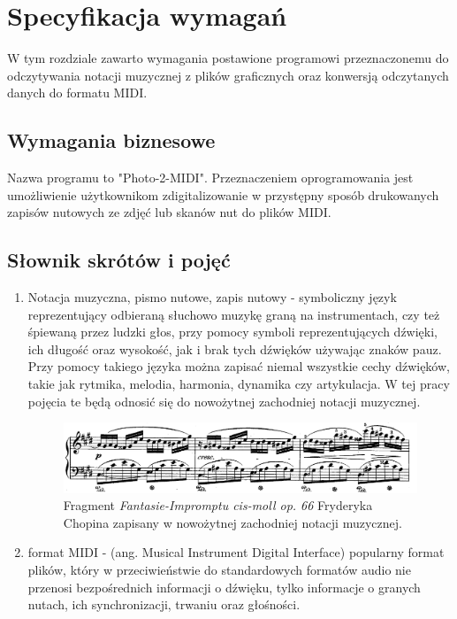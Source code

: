 \chapter{Specyfikacja wymagań}
W tym rozdziale zawarto wymagania postawione programowi przeznaczonemu do odczytywania notacji muzycznej z plików graficznych oraz konwersją odczytanych danych do formatu MIDI.

\section{Wymagania biznesowe}
Nazwa programu to "Photo-2-MIDI". Przeznaczeniem oprogramowania jest umożliwienie użytkownikom zdigitalizowanie w przystępny sposób drukowanych zapisów nutowych ze zdjęć lub skanów nut do plików MIDI.

\section{Słownik skrótów i pojęć}

	\begin{enumerate}
		\item Notacja muzyczna, pismo nutowe, zapis nutowy - symboliczny język reprezentujący odbieraną słuchowo muzykę graną na instrumentach, czy też śpiewaną przez ludzki głos, przy pomocy symboli reprezentujących dźwięki, ich długość oraz wysokość, jak i brak tych dźwięków używając znaków pauz. Przy pomocy takiego języka można zapisać niemal wszystkie cechy dźwięków, takie jak rytmika, melodia, harmonia, dynamika czy artykulacja. W tej pracy pojęcia te będą odnosić się do nowożytnej zachodniej notacji muzycznej.
		
		\begin{figure}
			\centering
			\includegraphics[width=14cm]{images/chopin_fastasie_impromtu_no_4_op_66.png}
			\caption{Fragment \textit{Fantasie-Impromptu cis-moll op. 66} Fryderyka Chopina zapisany w nowożytnej zachodniej notacji muzycznej. }
			\label{fig:chopin_impromptu}
		\end{figure}
		
		\item format MIDI - (ang. Musical Instrument Digital Interface) popularny format plików, który w przeciwieństwie do standardowych formatów audio nie przenosi bezpośrednich informacji o dźwięku, tylko informacje o granych nutach, ich synchronizacji, trwaniu oraz głośności. 
	\end{enumerate}

